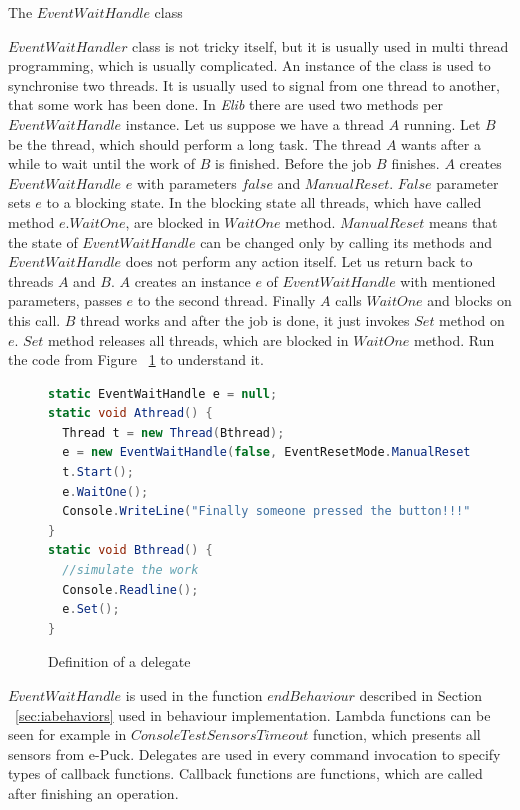   \begin{definition}[$EventWaitHandle$]
  The $EventWaitHandle$ class 
  \end{definition}
  $EventWaitHandler$ class is not tricky itself, 
  but it is usually used in multi thread programming, which is usually complicated.
  An instance of the class is used to synchronise two threads. 
  It is usually used to signal from one thread to another, 
  that some work has been done. In {\it Elib} there are used two 
  methods per~$EventWaitHandle$ instance.
  Let us suppose we have a thread $A$ running. Let $B$ be the thread, 
  which should perform a long task. 
  The thread $A$ wants after a while to wait until the work of $B$ is finished.
  Before the job $B$ finishes. $A$ creates $EventWaitHandle$ $e$ 
  with parameters $false$ and $ManualReset$. 
  $False$ parameter sets $e$ to a blocking state. In the blocking state all threads, 
  which have called method $e.WaitOne$, 
  are blocked in $WaitOne$ method. $ManualReset$ means that the state of $EventWaitHandle$ 
  can be changed only by calling its methods and $EventWaitHandle$ 
  does not perform any action itself.
  Let us return back to threads $A$ and $B$. $A$ creates an instance $e$ of $EventWaitHandle$ with mentioned parameters, 
  passes $e$ to the second thread. 
  Finally $A$ calls $WaitOne$ and blocks on this call.
  $B$ thread works and after the job is done, it just invokes $Set$ method on $e$. 
  $Set$ method releases all threads, which are blocked in $WaitOne$ method.
  Run the code from Figure ~\ref{ewh} to understand it.

          
\begin{figure}[!hbp]
\begin{lstlisting}[language=cs]
static EventWaitHandle e = null;
static void Athread() {
  Thread t = new Thread(Bthread);
  e = new EventWaitHandle(false, EventResetMode.ManualReset);
  t.Start();
  e.WaitOne();
  Console.WriteLine("Finally someone pressed the button!!!");
}
static void Bthread() {
  //simulate the work      
  Console.Readline();
  e.Set();
}
\end{lstlisting}
\caption{Definition of a delegate} \label{ewh}
\end{figure}

   $EventWaitHandle$ is used in the function $endBehaviour$ described in Section ~\ref{sec:iabehaviors} 
   used in behaviour implementation.
   Lambda functions can be seen for example in $ConsoleTestSensorsTimeout$ function, which presents all sensors from e-Puck.
   Delegates are used in every command invocation to specify types of callback functions.
   Callback functions are functions, which are called after finishing an operation. 
  
